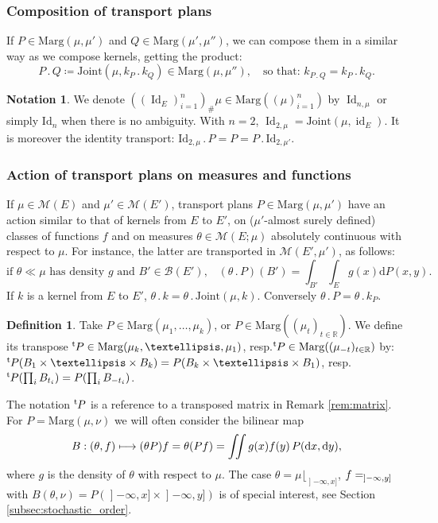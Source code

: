 \documentclass[11pt]{article}
\makeatletter
\newcommand{\resp}{resp.\xspace}
\newcommand{\ldot}{\mathbin{.}}
\newcommand\mto{\mathchoice{\longmapsto}{\mapsto}{\mapsto}{\mapsto}}
\DeclareRobustCommand{\mathbbm}[1]{\csname jepbb@#1\endcsname}
\theoremstyle{plain}
\theoremstyle{definition}
\newtheorem{defi}[them]{Definition}
\newtheorem{notation}[them]{Notation} %
\newcommand{\dd}{\mathrm{d}}
\newcommand{\id}{\mathrm{Id}}
\newcommand{\join}{\mathrm{Joint}}
\newcommand{\idk}{\operatorname{id}}
\newcommand{\Id}{\operatorname{Id}}
\newcommand{\one}{\mathbbm{1}}
\newcommand{\trans}{{}^{\mathrm{t}}\mkern-1mu}
\newcommand{\eqdefup}{\coloneqq}
\newcommand{\m}{\mathcal{M}}
\newcommand{\ma}{\mathrm{Marg}}
\newcommand{\R}{\mathbb{R}}
\newcommand{\op}{\mathopen}
\makeatother
\begin{document}
\subsubsection{Composition of transport plans}\label{subsubsec:composition} If $P\in\ma(\mu,\mu')$ and $Q\in\ma(\mu',\mu'')$, we can compose them in a similar way as we compose kernels, getting the product:\vspace*{-3pt}
\[P\ldot Q\eqdefup\join(\mu,k_P\ldot k_Q)\in\ma(\mu,\mu''),\quad \text{so that: }k_{P\ldot Q}=k_P\ldot k_Q.\]

\begin{notation}\label{notation:transport_id}
We denote $((\Id_E)_{i=1}^n)_\#\mu\in\ma((\mu)_{i=1}^n)$ by $\Id_{n,\mu}$ or simply $\id_n$ when there is no ambiguity. With $n=2$, $\Id_{2,\mu}=\join(\mu,\idk_E)$. It is moreover the identity transport: $\id_{2,\mu}{}\ldot P=P=P\ldot \id_{2,\mu'}$.
\end{notation}

\subsubsection{Action of transport plans on measures and functions}\label{subsubsec:action_des_transports} If $\mu\in\m(E)$ and $\mu'\in\m(E')$, transport plans $P\in\ma(\mu,\mu')$ have an action similar to that of kernels from $E$ to $E'$, on ($\mu'$-almost surely defined) classes of functions $f$ and on measures $\theta\in\m(E;\mu)$ absolutely continuous with respect to $\mu$. For instance, the latter are transported in $\m(E',\mu')$, as follows:
\[\text{if $\theta\ll \mu$ has density $g$ and $B'\in{\mathcal B}(E')$,}\quad(\theta\ldot P)(B')=\int_{B'}\int_E g(x)\dd P(x,y).\]
If $k$ is a kernel from $E$ to $E'$, $\theta\ldot k=\theta\ldot \join(\mu,k)$. Conversely $\theta\ldot P=\theta\ldot k_P$.

\begin{defi}\label{defi:transpose} Take $P\in\ma(\mu_1,\ldots,\mu_k)$, or $P\in\ma((\mu_t)_{t\in\R})$. We define its transpose $\trans P\in\ma(\mu_k,\ldots,\mu_1)$, \resp $\trans P\in\ma((\mu_{-t})_{t\in\R})$ by: $ \trans P(B_1\times \ldots\times B_k)=P(B_k\times\ldots\times B_1)$, \resp $\trans P(\prod_iB_{t_i})=P(\prod_iB_{-t_i})$.
\end{defi}

The notation $\trans P$ is a reference to a transposed matrix in Remark \ref{rem:matrix}. For $P=\ma(\mu,\nu)$ we will often consider the bilinear map
\[B:(\theta,f)\mto (\theta P)f=\theta (Pf)=\iint g(x)f(y)\,P(\dd x,\dd y),\]
where $g$ is the density of $\theta$ with respect to $\mu$. The case $\theta=\mu\lfloor_{\op]-\infty,x]}$, $f=\one_{\op]-\infty,y]}$ with $B(\theta,\nu)=P(\op]-\infty,x]\times\op]-\infty,y])$ is of special interest, see Section~ \ref{subsec:stochastic_order}.
\end{document}
